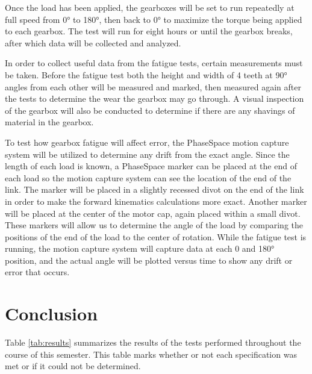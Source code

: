 Once the load has been applied, the gearboxes will be set to run repeatedly at full speed from 0° to 180°, then back to 0° to maximize the torque being applied to each gearbox. The test will run for eight hours or until the gearbox breaks, after which data will be collected and analyzed.

In order to collect useful data from the fatigue tests, certain measurements must be taken. Before the fatigue test both the height and width of 4 teeth at 90° angles from each other will be measured and marked, then measured again after the tests to determine the wear the gearbox may go through. A visual inspection of the gearbox will also be conducted to determine if there are any shavings of material in the gearbox.

To test how gearbox fatigue will affect error, the PhaseSpace motion capture system will be utilized to determine any drift from the exact angle. Since the length of each load is known, a PhaseSpace marker can be placed at the end of each load so the motion capture system can see the location of the end of the link. The marker will be placed in a slightly recessed divot on the end of the link in order to make the forward kinematics calculations more exact. Another marker will be placed at the center of the motor cap, again placed within a small divot. These markers will allow us to determine the angle of the load by comparing the positions of the end of the load to the center of rotation. While the fatigue test is running, the motion capture system will capture data at each 0 and 180° position, and the actual angle will be plotted versus time to show any drift or error that occurs.

\section{Conclusion}\label{sec:conc}
Table \ref{tab:results} summarizes the results of the tests performed throughout the course of this semester. This table marks whether or not each specification was met or if it could not be determined.

